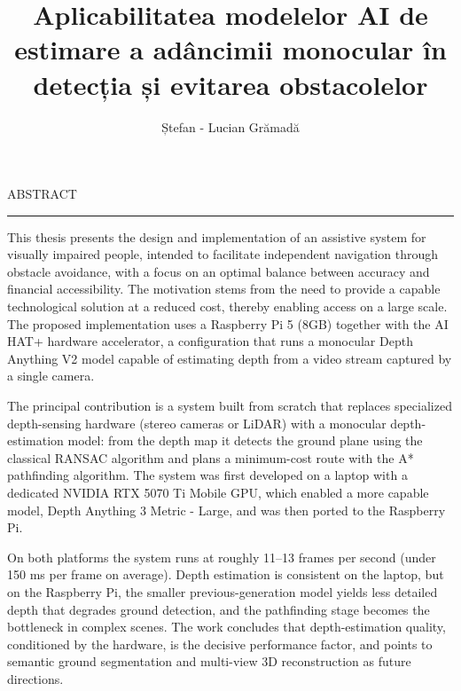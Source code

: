 \documentclass[12pt]{report}
\begin{document}
\title{Aplicabilitatea modelelor AI de estimare a adâncimii monocular în detecția și evitarea obstacolelor}
\author{Ștefan - Lucian Grămadă}

\maketitle
\maketitleeng


\newpage
{} 

\cleardoublepage
ABSTRACT
\vspace{0.5cm}	
\hrule
\vspace{0.5cm}	


This thesis presents the design and implementation of an assistive system for visually impaired people, intended to facilitate independent navigation through obstacle avoidance, with a focus on an optimal balance between accuracy and financial accessibility. The motivation stems from the need to provide a capable technological solution at a reduced cost, thereby enabling access on a large scale. The proposed implementation uses a Raspberry Pi 5 (8GB) together with the AI HAT+ hardware accelerator, a configuration that runs a monocular Depth Anything V2 model capable of estimating depth from a video stream captured by a single camera.

The principal contribution is a system built from scratch that replaces specialized depth-sensing hardware (stereo cameras or LiDAR) with a monocular depth-estimation model: from the depth map it detects the ground plane using the classical RANSAC algorithm and plans a minimum-cost route with the A* pathfinding algorithm. The system was first developed on a laptop with a dedicated NVIDIA RTX 5070 Ti Mobile GPU, which enabled a more capable model, Depth Anything 3 Metric - Large, and was then ported to the Raspberry Pi.

On both platforms the system runs at roughly 11--13 frames per second (under 150 ms per frame on average). Depth estimation is consistent on the laptop, but on the Raspberry Pi, the smaller previous-generation model yields less detailed depth that degrades ground detection, and the pathfinding stage becomes the bottleneck in complex scenes. The work concludes that depth-estimation quality, conditioned by the hardware, is the decisive performance factor, and points to semantic ground segmentation and multi-view 3D reconstruction as future directions.
\end{document}
